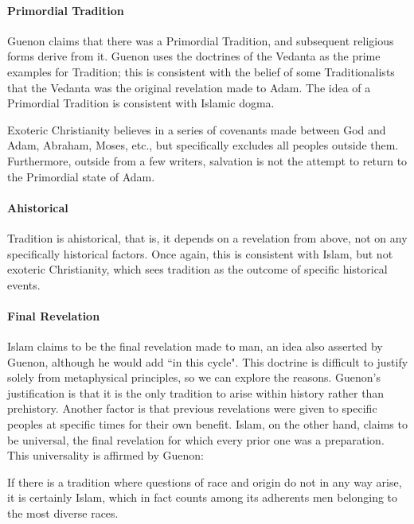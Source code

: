 \paragraph{Primordial Tradition}
Guenon claims that there was a Primordial Tradition, and subsequent religious forms derive from it. Guenon uses the doctrines of the Vedanta as the prime examples for Tradition; this is consistent with the belief of some Traditionalists that the Vedanta was the original revelation made to Adam. The idea of a Primordial Tradition is consistent with Islamic dogma.

Exoteric Christianity believes in a series of covenants made between God and Adam, Abraham, Moses, etc., but specifically excludes all peoples outside them. Furthermore, outside from a few writers, salvation is not the attempt to return to the Primordial state of Adam.

\paragraph{Ahistorical}
Tradition is ahistorical, that is, it depends on a revelation from above, not on any specifically historical factors. Once again, this is consistent with Islam, but not exoteric Christianity, which sees tradition as the outcome of specific historical events.

\paragraph{Final Revelation}
Islam claims to be the final revelation made to man, an idea also asserted by Guenon, although he would add ``in this cycle". This doctrine is difficult to justify solely from metaphysical principles, so we can explore the reasons. Guenon's justification is that it is the only tradition to arise within history rather than prehistory. Another factor is that previous revelations were given to specific peoples at specific times for their own benefit. Islam, on the other hand, claims to be universal, the final revelation for which every prior one was a preparation. This universality is affirmed by Guenon:

\begin{quotex}
If there is a tradition where questions of race and origin do not in any way arise, it is certainly Islam, which in fact counts among its adherents men belonging to the most diverse races. 

\end{quotex}


